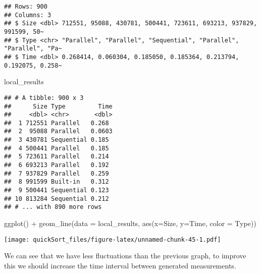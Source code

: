 \documentclass[
]{article}
\newenvironment{Shaded}{\begin{snugshade}}{\end{snugshade}}
\newcommand{\AttributeTok}[1]{\textcolor[rgb]{0.77,0.63,0.00}{#1}}
\newcommand{\FunctionTok}[1]{\textcolor[rgb]{0.00,0.00,0.00}{#1}}
\newcommand{\NormalTok}[1]{#1}
\newcommand{\OtherTok}[1]{\textcolor[rgb]{0.56,0.35,0.01}{#1}}
\newcommand{\SpecialCharTok}[1]{\textcolor[rgb]{0.00,0.00,0.00}{#1}}
\begin{document}
\begin{verbatim}
## Rows: 900
## Columns: 3
## $ Size <dbl> 712551, 95088, 430781, 500441, 723611, 693213, 937829, 991599, 50~
## $ Type <chr> "Parallel", "Parallel", "Sequential", "Parallel", "Parallel", "Pa~
## $ Time <dbl> 0.268414, 0.060304, 0.185050, 0.185364, 0.213794, 0.192075, 0.258~
\end{verbatim}

\begin{Shaded}
\begin{Highlighting}[]
\NormalTok{local\_results}
\end{Highlighting}
\end{Shaded}

\begin{verbatim}
## # A tibble: 900 x 3
##      Size Type         Time
##     <dbl> <chr>       <dbl>
##  1 712551 Parallel   0.268 
##  2  95088 Parallel   0.0603
##  3 430781 Sequential 0.185 
##  4 500441 Parallel   0.185 
##  5 723611 Parallel   0.214 
##  6 693213 Parallel   0.192 
##  7 937829 Parallel   0.259 
##  8 991599 Built-in   0.312 
##  9 500441 Sequential 0.123 
## 10 813284 Sequential 0.212 
## # ... with 890 more rows
\end{verbatim}

\begin{Shaded}
\begin{Highlighting}[]
\FunctionTok{ggplot}\NormalTok{() }\SpecialCharTok{+}               
  \FunctionTok{geom\_line}\NormalTok{(}\AttributeTok{data =}\NormalTok{ local\_results, }\FunctionTok{aes}\NormalTok{(}\AttributeTok{x=}\NormalTok{Size, }\AttributeTok{y=}\NormalTok{Time, }\AttributeTok{color =}\NormalTok{ Type))}
\end{Highlighting}
\end{Shaded}

\texttt{[image: quickSort\_files/figure-latex/unnamed-chunk-45-1.pdf]}

We can see that we have less fluctuations than the previous graph, to
improve this we should increase the time interval between generated
measurements.

\begin{Shaded}
\end{Shaded}
\end{document}
